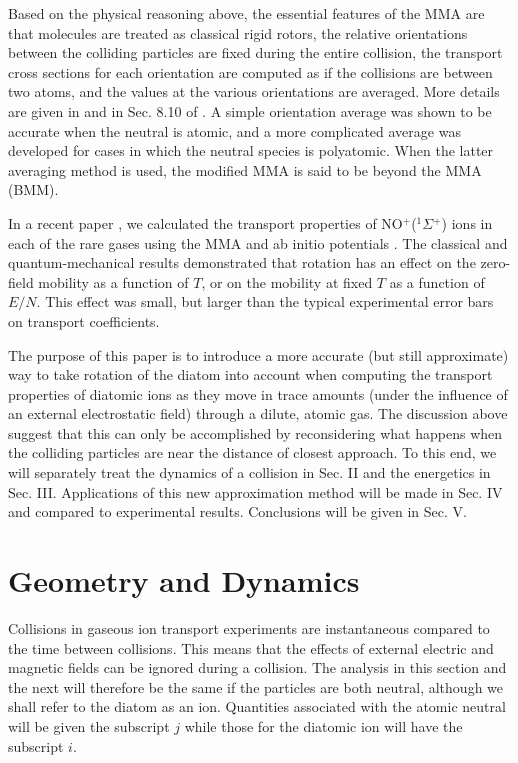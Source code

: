 \documentclass[article]{revtex4-2}
\begin{document}
Based on the physical reasoning above, the essential features of the MMA are that molecules are treated as classical rigid rotors, the relative orientations between the colliding particles are fixed during the entire collision, the transport cross sections for each orientation are computed as if the collisions are between two atoms, and the values at the various orientations are averaged. More details are given in \cite{monchick1961} and in Sec. 8.10 of \cite{Viehland2018}.  A simple orientation average was shown to be accurate when the neutral is atomic, and a more complicated average was developed 
\cite{Viehland2012, Gharibi2013, Viehland2014} for cases in which the neutral species is polyatomic.  When the latter averaging method is used, the modified MMA is said to be beyond the MMA (BMM).

In a recent paper \cite{skullerud2021}, we calculated the transport properties of NO$^+$($^1$$\Sigma$$^+$) ions in each of the rare gases using the MMA and ab initio potentials \cite{orek2016}.  The classical and quantum-mechanical results demonstrated that rotation has an effect on the zero-field mobility as a function of $T$, or on the mobility at fixed $T$ as a function of $E/N$. This effect was small, but larger than the typical experimental error bars on transport coefficients.

The purpose of this paper is to introduce a more accurate (but still approximate) way to take rotation of the diatom into account when computing the transport properties of diatomic ions as they move in trace amounts (under the influence of an external electrostatic field) through a dilute, atomic gas.  The discussion above suggest that this can only be accomplished by reconsidering what happens when the colliding particles are near the distance of closest approach. To this end, we will separately treat the dynamics of a collision in Sec. II and the energetics in Sec. III. Applications of this new approximation method will be made in Sec. IV and compared to experimental results. Conclusions will be given in Sec. V.

\section{Geometry and Dynamics}
Collisions in gaseous ion transport experiments are instantaneous compared to the time between collisions. This means that the effects of external electric and magnetic fields can be ignored during a collision. The analysis in this section and the next will therefore be the same if the particles are both neutral, although we shall refer to the diatom as an ion. Quantities associated with the atomic neutral will be given the subscript $j$ while those for the diatomic ion will have the subscript $i$.
\end{document}

